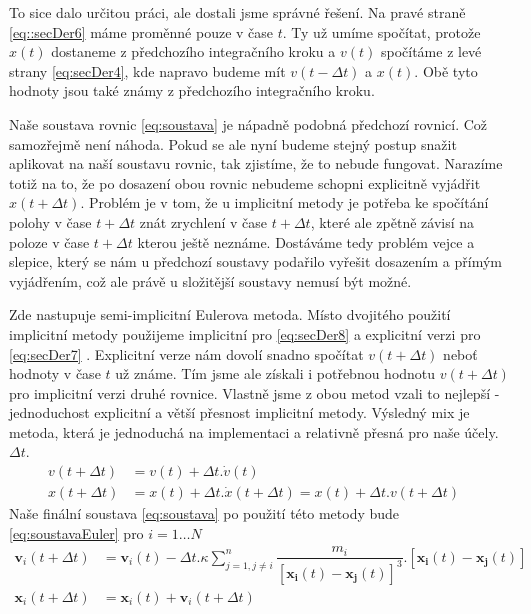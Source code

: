 To sice dalo určitou práci, ale dostali jsme správné řešení. Na pravé straně \eqref{eq::secDer6} máme proměnné pouze v čase $ t $. Ty už umíme spočítat, protože $ x(t) $ dostaneme z předchozího integračního kroku a $ v(t) $ spočítáme z levé strany \eqref{eq:secDer4}, kde napravo budeme mít  $ v(t-\Delta t) $ a $ x(t) $. Obě tyto hodnoty jsou také známy z předchozího integračního kroku.

Naše soustava rovnic \eqref{eq:soustava} je nápadně podobná předchozí rovnicí. Což samozřejmě není náhoda. Pokud se ale nyní budeme stejný postup snažit aplikovat na naší soustavu rovnic, tak zjistíme, že to nebude fungovat. Narazíme totiž na to, že po dosazení obou rovnic nebudeme schopni explicitně vyjádřit $ x(t + \Delta t) $. Problém je v tom, že u implicitní metody je potřeba  ke spočítání polohy v čase $ t + \Delta t $ znát zrychlení v čase $ t + \Delta t $, které ale zpětně závisí na poloze v čase $ t + \Delta t $ kterou ještě neznáme. Dostáváme tedy problém vejce a slepice, který se nám u předchozí soustavy podařilo vyřešit dosazením a přímým vyjádřením, což ale právě u složitější soustavy nemusí být možné.

Zde nastupuje semi-implicitní Eulerova metoda. Místo dvojitého použití implicitní metody použijeme implicitní pro \ref{eq:secDer8} a explicitní verzi pro \ref{eq:secDer7} . Explicitní verze nám dovolí snadno spočítat $ v(t + \Delta t) $ neboť hodnoty v čase $ t $ už známe. Tím jsme ale získali i potřebnou hodnotu $ v(t + \Delta t) $ pro implicitní verzi druhé rovnice. Vlastně jsme z obou metod vzali to nejlepší - jednoduchost explicitní a větší přesnost implicitní metody. Výsledný mix je metoda, která je jednoduchá na implementaci a relativně přesná pro naše účely. $ \Delta t $.
\begin{align}
\label{eq:secDer7}
v(t + \Delta t)&=v(t) + \Delta t . \dot{v}(t)\\
\label{eq:secDer8}
x(t+\Delta t) &= x(t) + \Delta t. \dot{x}(t + \Delta t) = x(t) + \Delta t.v(t + \Delta t)\quad
\end{align}
Naše finální soustava \eqref{eq:soustava} po použití této metody bude \eqref{eq:soustavaEuler} pro $ i=1 \dots N $
\begin{subequations}\label{eq:soustavaEuler}
\begin{align}
\boldsymbol {v}_i(t+\Delta t) &=\boldsymbol{{v}}_i(t)  - \Delta t . \kappa \sum_{j=1,j \neq i}^{n}\dfrac{m_i}
{\left[ \boldsymbol{x_i}(t) - \boldsymbol{x_j}(t)\right] ^3} . 
\left[ \boldsymbol{x_i}(t) - \boldsymbol{x_j}(t)\right] \\
\boldsymbol {x}_i(t+\Delta t)& =\boldsymbol{{x}}_i(t)  +\boldsymbol {v}_i(t+\Delta t)
\end{align}
\end{subequations}

